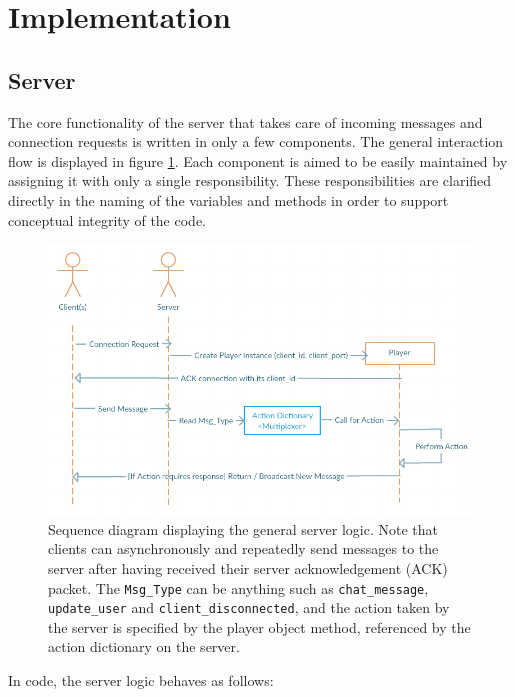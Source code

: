 \documentclass[bsc,frontabs,twoside,singlespacing,parskip,deptreport]{infthesis}     %
\begin{document}
\section{Implementation}
\subsection{Server}
The core functionality of the server that takes care of incoming messages and connection requests is written in only a few components. The general interaction flow is displayed in figure \ref{fig:server_sequence_diagram}. Each component is aimed to be easily maintained by assigning it with only a single responsibility. These responsibilities are clarified directly in the naming of the variables and methods in order to support conceptual integrity of the code.

\begin{figure}[H]
\includegraphics[scale=0.60]{images/server_sequence_diagram.jpg}
\caption{Sequence diagram displaying the general server logic. Note that clients can asynchronously and repeatedly send messages to the server after having received their server acknowledgement (ACK) packet. The \texttt{Msg\_Type} can be anything such as \texttt{chat\_message}, \texttt{update\_user} and \texttt{client\_disconnected}, and the action taken by the server is specified by the player object method, referenced by the action dictionary on the server.}
\label{fig:server_sequence_diagram}
\vspace{1em}
\end{figure}

In code, the server logic behaves as follows:
\end{document}
